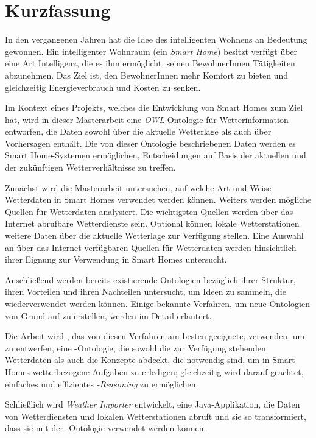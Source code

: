 \chapter*{Kurzfassung}

In den vergangenen Jahren hat die Idee des intelligenten Wohnens an Bedeutung gewonnen. Ein intelligenter Wohnraum (ein \emph{Smart Home}) besitzt verfügt über eine Art Intelligenz, die es ihm ermöglicht, seinen BewohnerInnen Tätigkeiten abzunehmen. Das Ziel ist, den BewohnerInnen mehr Komfort zu bieten und gleichzeitig Energieverbrauch und Kosten zu senken.

Im Kontext eines Projekts, welches die Entwicklung von Smart Homes zum Ziel hat, wird in dieser Masterarbeit eine \emph{OWL}-Ontologie für Wetterinformation entworfen, die Daten sowohl über die aktuelle Wetterlage als auch über Vorhersagen enthält. Die von dieser Ontologie beschriebenen Daten werden es Smart Home-Systemen ermöglichen, Entscheidungen auf Basis der aktuellen und der zukünftigen Wetterverhältnisse zu treffen.

Zunächst wird die Masterarbeit untersuchen, auf welche Art und Weise Wetterdaten in Smart Homes verwendet werden können. Weiters werden mögliche Quellen für Wetterdaten analysiert. Die wichtigsten Quellen werden über das Internet abrufbare Wetterdienste sein. Optional können lokale Wetterstationen weitere Daten über die aktuelle Wetterlage zur Verfügung stellen. Eine Auswahl an über das Internet verfügbaren Quellen für Wetterdaten werden hinsichtlich ihrer Eignung zur Verwendung in Smart Homes untersucht.

Anschließend werden bereits existierende Ontologien bezüglich ihrer Struktur, ihren Vorteilen und ihren Nachteilen untersucht, um Ideen zu sammeln, die wiederverwendet werden können. Einige bekannte Verfahren, um neue Ontologien von Grund auf zu erstellen, werden im Detail erläutert.

Die Arbeit wird \methontology, das von diesen Verfahren am besten geeignete, verwenden, um \smarthomeweather zu entwerfen, eine -Ontologie, die sowohl die zur Verfügung stehenden Wetterdaten als auch die Konzepte abdeckt, die notwendig sind, um in Smart Homes wetterbezogene Aufgaben zu erledigen; gleichzeitig wird darauf geachtet, einfaches und effizientes \emph{-Reasoning} zu ermöglichen.

Schließlich wird \emph{Weather Importer} entwickelt, eine Java-Applikation, die Daten von Wetterdiensten und lokalen Wetterstationen abruft und sie so transformiert, dass sie mit der \smarthomeweather-Ontologie verwendet werden können.